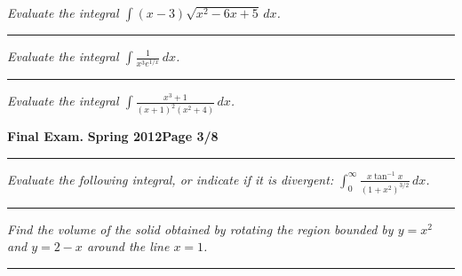 \documentclass[12pt]{article}
\begin{document}
{\problem[5 pts] \em Evaluate the integral $\displaystyle{\int (x-3) \sqrt{x^2-6x+5}\, dx}$.}
\vspace{2cm}
\begin{flushright}
\end{flushright}
\hrule

{\problem[5 pts] \em Evaluate the integral $\displaystyle{\int
    \frac{1}{x^3 e^{1/x}}\, dx}$.}
\vspace{2cm}
\begin{flushright}
\end{flushright}
\hrule

{\problem[5 pts] \em Evaluate the integral $\displaystyle{\int \frac{x^3+1}{(x+1)^2(x^2+4)}\, dx}$.}
\vspace{5.5cm}
\begin{flushright}
\end{flushright}
\newpage


\hfill{\large\bf Final Exam.}\hfill{\large\bf
  Spring 2012}\hfill{\large\bf Page 3/8}\hrule

\bigskip
{\problem[5 pts] \em Evaluate the following integral, or indicate if it is
divergent: $\displaystyle{\int_0^\infty \frac{x \tan^{-1}x}{(1+x^2)^{3/2}}\,
dx}$.}
\vspace{5.5cm}
\begin{flushright}
\end{flushright}
\hrule

{\problem[5 pts] \em Find the volume of the solid obtained by rotating the region bounded by $y=x^2$ and $y=2-x$ around the line $x=1$.}
\vspace{4.5cm}
\begin{flushright}
\end{flushright}
\hrule
 
\end{document}
